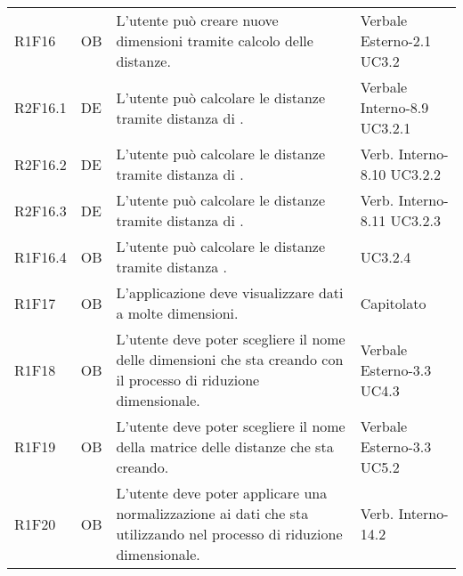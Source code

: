 {\begin{longtable}{C{2cm} | C{1.5cm} | C{9cm} | C{3.3cm}}
R1F16 & OB & L'utente può creare nuove dimensioni tramite calcolo delle distanze. & Verbale Esterno-2.1 \newline UC3.2\\ 
R2F16.1 & DE & L'utente può calcolare le distanze tramite distanza di . &  Verbale Interno-8.9 \newline UC3.2.1\\
R2F16.2 & DE & L'utente può calcolare le distanze tramite distanza di . & Verb. Interno-8.10 \newline UC3.2.2 \\
R2F16.3 & DE & L'utente può calcolare le distanze tramite distanza di . &  Verb. Interno-8.11 \newline UC3.2.3\\
R1F16.4 & OB & L'utente può calcolare le distanze tramite distanza . &  UC3.2.4\\
R1F17 & OB & L'applicazione deve visualizzare dati a molte dimensioni. & Capitolato\\
R1F18 & OB & L'utente deve poter scegliere il nome delle dimensioni che sta creando con il processo di riduzione dimensionale. & Verbale Esterno-3.3 \newline UC4.3\\

R1F19 & OB & L'utente deve poter scegliere il nome della matrice delle distanze che sta creando. & Verbale Esterno-3.3 \newline UC5.2\\

R1F20 & OB & L'utente deve poter applicare una normalizzazione ai dati che sta utilizzando nel processo di riduzione dimensionale. & Verb. Interno-14.2\\

\end{longtable}
}







